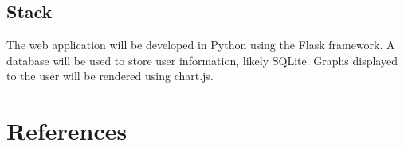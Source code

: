 \documentclass[12pt]{article}
\begin{document}
\subsection{Stack}
The web application will be developed in Python using the Flask framework. A database will be used to store user information, likely SQLite. Graphs displayed to the user will be rendered using chart.js.
\section{References}

\begingroup
\renewcommand{\section}[2]{}
\begin{thebibliography}{10}

\bigskip


\end{thebibliography}
\endgroup
\end{document}
